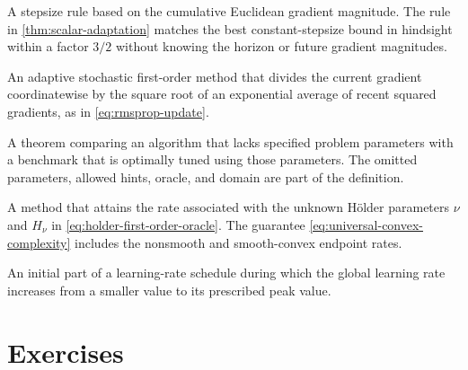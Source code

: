 \documentclass[11pt,twoside]{article}
\theoremstyle{definition}
\theoremstyle{remark}
\begin{document}
\begin{description}[style=nextline,leftmargin=1.5em,labelindent=0pt]
A stepsize rule based on the cumulative Euclidean gradient magnitude. The
rule in \cref{thm:scalar-adaptation} matches the best constant-stepsize bound
in hindsight within a factor $3/2$ without knowing the horizon or future
gradient magnitudes.
\item[RMSProp]
An adaptive stochastic first-order method that divides the current gradient
coordinatewise by the square root of an exponential average of recent squared
gradients, as in \cref{eq:rmsprop-update}.
\item[Tuning-free guarantee]
A theorem comparing an algorithm that lacks specified problem parameters
with a benchmark that is optimally tuned using those parameters. The omitted
parameters, allowed hints, oracle, and domain are part of the definition.
\item[Universal convex method]
A method that attains the rate associated with the unknown H\"older parameters
$\nu$ and $H_\nu$ in \cref{eq:holder-first-order-oracle}. The guarantee
\cref{eq:universal-convex-complexity} includes the nonsmooth and
smooth-convex endpoint rates.
\item[Warmup phase]
An initial part of a learning-rate schedule during which the global learning
rate increases from a smaller value to its prescribed peak value.
\end{description}

\section{Exercises}
\label{sec:exercises}

\exerciseinstructions
\setcounter{courseexercise}{0}








\end{document}
